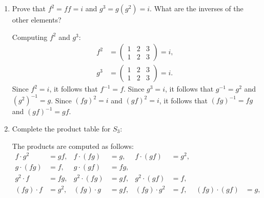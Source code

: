 \begin{enumerate}
\begin{enumerate}
\begin{subprove}
\begin{align*}
        g^{2} &= \begin{pmatrix} 1 & 2 & 3 \\ 3 & 1 & 2 \end{pmatrix}, &
        f g &= \begin{pmatrix} 1 & 2 & 3 \\ 1 & 3 & 2 \end{pmatrix}, &
        g f &= \begin{pmatrix} 1 & 2 & 3 \\ 3 & 2 & 1 \end{pmatrix}.
      \end{align*}
      Since \(|S_{3}| = 3! = 6\) and these six elements have distinct two-line representations, they are all distinct and form all elements of \(S_{3}\).
    \end{subprove}
    \newpage
    \item Prove that \(f^{2} = f f = i\) and \(g^{3} = g(g^{2}) = i\). What are the inverses of the other elements?
    \begin{subprove}
      Computing \(f^{2}\) and \(g^{3}\):
      \begin{align*}
        f^{2} &= \begin{pmatrix} 1 & 2 & 3 \\ 1 & 2 & 3 \end{pmatrix} = i, \\
        g^{3} &= \begin{pmatrix} 1 & 2 & 3 \\ 1 & 2 & 3 \end{pmatrix} = i.
      \end{align*}
      Since \(f^{2} = i\), it follows that \(f^{-1} = f\).
      Since \(g^{3} = i\), it follows that \(g^{-1} = g^{2}\) and \((g^{2})^{-1} = g\).
      Since \((f g)^{2} = i\) and \((g f)^{2} = i\), it follows that \((f g)^{-1} = f g\) and \((g f)^{-1} = g f\).
    \end{subprove}
    \item Complete the product table for \(S_{3}\):
    \begin{subprove}
      The products are computed as follows:
      \begin{align*}
        f \cdot g^{2} &= g f, & f \cdot (f g) &= g, & f \cdot (g f) &= g^{2}, \\
        g \cdot (f g) &= f, & g \cdot (g f) &= f g, \\
        g^{2} \cdot f &= f g, & g^{2} \cdot (f g) &= g f, & g^{2} \cdot (g f) &= f, \\
        (f g) \cdot f &= g^{2}, & (f g) \cdot g &= g f, & (f g) \cdot g^{2} &= f, & (f g) \cdot (g f) &= g, \\

\end{align*}
\end{subprove}
\end{enumerate}
\end{enumerate}
